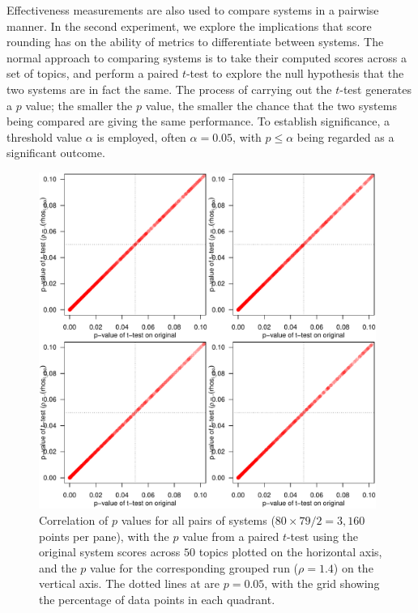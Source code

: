 
Effectiveness measurements are also used to compare systems in a
pairwise manner.
In the second experiment, we explore the implications that score
rounding has on the ability of metrics to differentiate between
systems.
The normal approach to comparing systems is to take their computed
scores across a set of topics, and perform a paired $t$-test to
explore the null hypothesis that the two systems are in fact the
same.
The process of carrying out the $t$-test generates a $p$ value; the
smaller the $p$ value, the smaller the chance that the two systems
being compared are giving the same performance.
To establish significance, a threshold value $\alpha$ is employed,
often $\alpha=0.05$, with $p\le\alpha$ being regarded as a
significant outcome.

\begin{figure}[t!]
\centering
\includegraphics[width=0.98\textwidth,page=5]{figs/p_value_scatter_sys_pairs.pdf}
\caption{Correlation of $p$ values for all pairs of systems
($80\times79/2=3{,}160$ points per pane), with the $p$ value from a
paired $t$-test using the original system scores across $50$ topics
plotted on the horizontal axis, and the $p$ value for the
corresponding grouped run ($\rho=1.4$) on the vertical axis.
The dotted lines at are $p=0.05$, with the grid showing the
percentage of data points in each quadrant.
\label{fig-pair-variation}}
\end{figure}


